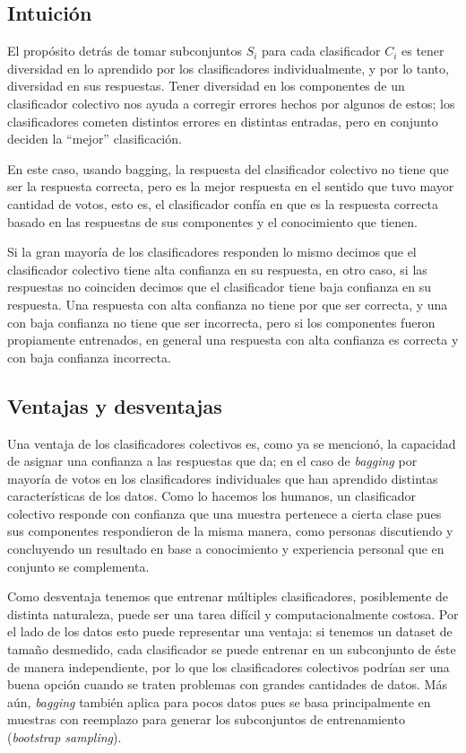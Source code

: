 \documentclass[spanish,11pt,letterpaper]{article}
\begin{document}
\subsection{Intuición}

El propósito detrás de tomar subconjuntos $S_i$ para cada clasificador $C_i$ es
tener diversidad en lo aprendido por los clasificadores individualmente, y por lo
tanto, diversidad en sus respuestas. Tener diversidad en los componentes de un
clasificador colectivo nos ayuda a corregir errores hechos por algunos de estos;
los clasificadores cometen distintos errores en distintas entradas, pero en conjunto
deciden la ``mejor'' clasificación.

En este caso, usando bagging, la respuesta del clasificador colectivo no tiene
que ser la respuesta correcta, pero es la mejor respuesta en el sentido que
tuvo mayor cantidad de votos, esto es, el clasificador confía en que es la
respuesta correcta basado en las respuestas de sus componentes y el conocimiento
que tienen.

Si la gran mayoría de los clasificadores responden lo mismo decimos que el clasificador
colectivo tiene alta confianza en su respuesta, en otro caso, si las respuestas
no coinciden decimos que el clasificador tiene baja confianza en su respuesta.
Una respuesta con alta confianza no tiene por que ser correcta, y una con baja
confianza no tiene que ser incorrecta, pero si los componentes fueron propiamente
entrenados, en general una respuesta con alta confianza es correcta y con baja
confianza incorrecta\cite{scholarpedia}.

\subsection{Ventajas y desventajas}

Una ventaja de los clasificadores colectivos es, como ya se mencionó, la capacidad
de asignar una confianza a las respuestas que da; en el caso de \textit{bagging}
por mayoría de votos en los clasificadores individuales que han aprendido
distintas características de los datos. Como lo hacemos los humanos, un clasificador
colectivo responde con confianza que una muestra pertenece a cierta clase pues
sus componentes respondieron de la misma manera, como personas discutiendo
y concluyendo un resultado en base a conocimiento y experiencia personal que
en conjunto se complementa.

Como desventaja tenemos que entrenar múltiples clasificadores, posiblemente de
distinta naturaleza, puede ser una tarea difícil y computacionalmente costosa.
Por el lado de los datos esto puede representar una ventaja: si tenemos un dataset
de tamaño desmedido, cada clasificador se puede entrenar en un subconjunto de éste
de manera independiente, por lo que los clasificadores colectivos podrían ser
una buena opción cuando se traten problemas con grandes cantidades de datos. Más aún,
\textit{bagging} también aplica para pocos datos pues se basa principalmente en
muestras con reemplazo para generar los subconjuntos de entrenamiento
(\textit{bootstrap sampling}).
\end{document}
